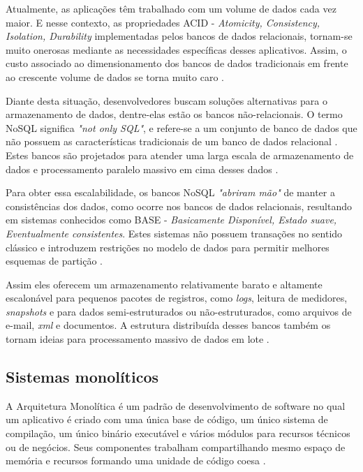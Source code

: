 Atualmente, as aplicações têm trabalhado com um volume de dados cada vez maior.
E nesse contexto, as propriedades ACID - \textit{Atomicity, Consistency,
Isolation, Durability} implementadas pelos bancos de dados relacionais,
tornam-se muito onerosas mediante as necessidades específicas desses aplicativos.
Assim, o custo associado ao dimensionamento dos bancos de dados tradicionais em
frente ao crescente volume de dados se torna muito caro \cite{Gajendran}.

Diante desta situação, desenvolvedores buscam soluções alternativas para o
armazenamento de dados, dentre-elas estão os bancos não-relacionais. O termo
NoSQL significa \textit{"not only SQL"}, e refere-se a um conjunto
de banco de dados que não possuem as características tradicionais de um
banco de dados relacional \cite{Gajendran}. Estes bancos são projetados para
atender uma larga escala de armazenamento de dados e processamento paralelo
massivo em cima desses dados \cite{NewEraOfDatabases}.

Para obter essa escalabilidade, os bancos NoSQL \textit{"abriram mão"} de
manter a consistências dos dados, como ocorre nos bancos de dados relacionais,
resultando em sistemas conhecidos como BASE - \textit{Basicamente Disponível,
Estado suave, Eventualmente consistentes}. Estes sistemas não possuem
transações no sentido clássico e introduzem restrições no modelo de dados
para permitir melhores esquemas de partição .

Assim eles oferecem um armazenamento relativamente barato e altamente escalonável
para pequenos pacotes de registros, como \textit{logs}, leitura de medidores,
\textit{snapshots} e para dados semi-estruturados ou não-estruturados, como arquivos
de e-mail, \textit{xml} e documentos. A estrutura distribuída desses bancos também
os tornam ideias para processamento massivo de dados em lote \cite{NewEraOfDatabases}.

\subsection{Sistemas monolíticos}

A Arquitetura Monolítica é um padrão de desenvolvimento de software no qual um aplicativo
é criado com uma única base de código, um único sistema de compilação, um único binário
executável e vários módulos para recursos técnicos ou de negócios. Seus componentes
trabalham compartilhando mesmo espaço de memória e recursos formando uma unidade de
código coesa \cite{NatalliaSakovich}.

